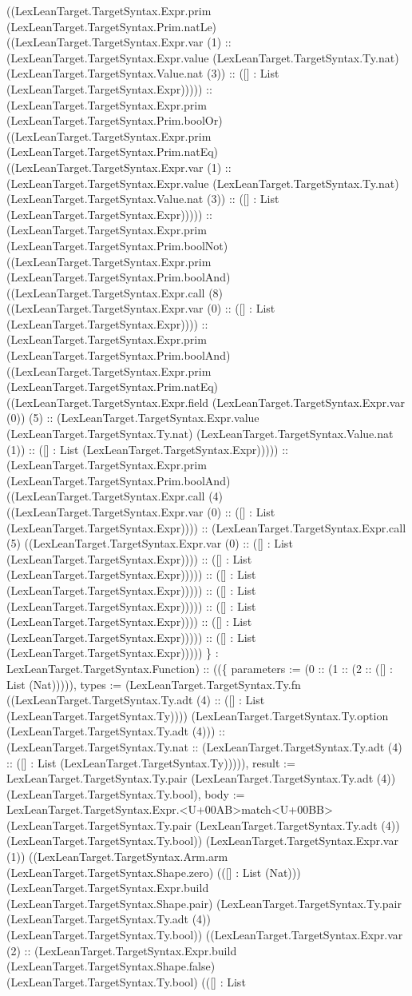 \documentclass[11pt]{article}
\begin{document}
((LexLeanTarget.TargetSyntax.Expr.prim (LexLeanTarget.TargetSyntax.Prim.natLe) ((LexLeanTarget.TargetSyntax.Expr.var (1) :: (LexLeanTarget.TargetSyntax.Expr.value (LexLeanTarget.TargetSyntax.Ty.nat) (LexLeanTarget.TargetSyntax.Value.nat (3)) :: ([] : List (LexLeanTarget.TargetSyntax.Expr))))) :: (LexLeanTarget.TargetSyntax.Expr.prim (LexLeanTarget.TargetSyntax.Prim.boolOr) ((LexLeanTarget.TargetSyntax.Expr.prim (LexLeanTarget.TargetSyntax.Prim.natEq) ((LexLeanTarget.TargetSyntax.Expr.var (1) :: (LexLeanTarget.TargetSyntax.Expr.value (LexLeanTarget.TargetSyntax.Ty.nat) (LexLeanTarget.TargetSyntax.Value.nat (3)) :: ([] : List (LexLeanTarget.TargetSyntax.Expr))))) :: (LexLeanTarget.TargetSyntax.Expr.prim (LexLeanTarget.TargetSyntax.Prim.boolNot) ((LexLeanTarget.TargetSyntax.Expr.prim (LexLeanTarget.TargetSyntax.Prim.boolAnd) ((LexLeanTarget.TargetSyntax.Expr.call (8) ((LexLeanTarget.TargetSyntax.Expr.var (0) :: ([] : List (LexLeanTarget.TargetSyntax.Expr)))) :: (LexLeanTarget.TargetSyntax.Expr.prim (LexLeanTarget.TargetSyntax.Prim.boolAnd) ((LexLeanTarget.TargetSyntax.Expr.prim (LexLeanTarget.TargetSyntax.Prim.natEq) ((LexLeanTarget.TargetSyntax.Expr.field (LexLeanTarget.TargetSyntax.Expr.var (0)) (5) :: (LexLeanTarget.TargetSyntax.Expr.value (LexLeanTarget.TargetSyntax.Ty.nat) (LexLeanTarget.TargetSyntax.Value.nat (1)) :: ([] : List (LexLeanTarget.TargetSyntax.Expr))))) :: (LexLeanTarget.TargetSyntax.Expr.prim (LexLeanTarget.TargetSyntax.Prim.boolAnd) ((LexLeanTarget.TargetSyntax.Expr.call (4) ((LexLeanTarget.TargetSyntax.Expr.var (0) :: ([] : List (LexLeanTarget.TargetSyntax.Expr)))) :: (LexLeanTarget.TargetSyntax.Expr.call (5) ((LexLeanTarget.TargetSyntax.Expr.var (0) :: ([] : List (LexLeanTarget.TargetSyntax.Expr)))) :: ([] : List (LexLeanTarget.TargetSyntax.Expr))))) :: ([] : List (LexLeanTarget.TargetSyntax.Expr))))) :: ([] : List (LexLeanTarget.TargetSyntax.Expr))))) :: ([] : List (LexLeanTarget.TargetSyntax.Expr)))) :: ([] : List (LexLeanTarget.TargetSyntax.Expr))))) :: ([] : List (LexLeanTarget.TargetSyntax.Expr))))) \} : LexLeanTarget.TargetSyntax.Function) :: ((\{ parameters := (0 :: (1 :: (2 :: ([] : List (Nat))))), types := (LexLeanTarget.TargetSyntax.Ty.fn ((LexLeanTarget.TargetSyntax.Ty.adt (4) :: ([] : List (LexLeanTarget.TargetSyntax.Ty)))) (LexLeanTarget.TargetSyntax.Ty.option (LexLeanTarget.TargetSyntax.Ty.adt (4))) :: (LexLeanTarget.TargetSyntax.Ty.nat :: (LexLeanTarget.TargetSyntax.Ty.adt (4) :: ([] : List (LexLeanTarget.TargetSyntax.Ty))))), result := LexLeanTarget.TargetSyntax.Ty.pair (LexLeanTarget.TargetSyntax.Ty.adt (4)) (LexLeanTarget.TargetSyntax.Ty.bool), body := LexLeanTarget.TargetSyntax.Expr.<U+00AB>match<U+00BB> (LexLeanTarget.TargetSyntax.Ty.pair (LexLeanTarget.TargetSyntax.Ty.adt (4)) (LexLeanTarget.TargetSyntax.Ty.bool)) (LexLeanTarget.TargetSyntax.Expr.var (1)) ((LexLeanTarget.TargetSyntax.Arm.arm (LexLeanTarget.TargetSyntax.Shape.zero) (([] : List (Nat))) (LexLeanTarget.TargetSyntax.Expr.build (LexLeanTarget.TargetSyntax.Shape.pair) (LexLeanTarget.TargetSyntax.Ty.pair (LexLeanTarget.TargetSyntax.Ty.adt (4)) (LexLeanTarget.TargetSyntax.Ty.bool)) ((LexLeanTarget.TargetSyntax.Expr.var (2) :: (LexLeanTarget.TargetSyntax.Expr.build (LexLeanTarget.TargetSyntax.Shape.false) (LexLeanTarget.TargetSyntax.Ty.bool) (([] : List 
\end{document}
